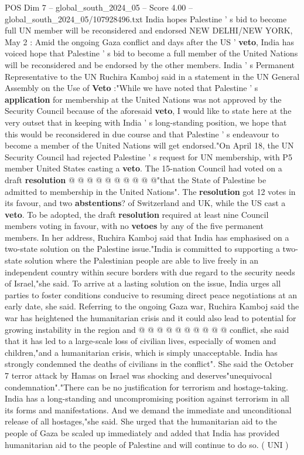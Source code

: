 \begin{textsample}{POS Dim 7 – global\_south\_2024\_05 – Score 4.00 – global\_south\_2024\_05/107928496.txt}  \label{ex:f7_pos_060}
India hopes Palestine ' s bid to become full UN member will be reconsidered and endorsed NEW DELHI/NEW YORK, May 2 : Amid the ongoing Gaza conflict and days after the US ' \textbf{veto}, India has voiced hope that Palestine ' s bid to become a full member of the United Nations will be reconsidered and be endorsed by the other members.
India ' s Permanent Representative to the UN Ruchira Kamboj said in a statement in the UN General Assembly on the Use of \textbf{Veto} :"While we have noted that Palestine ' s \textbf{application} for membership at the United Nations was not approved by the Security Council because of the aforesaid \textbf{veto}, I would like to state here at the very outset that in keeping with India ' s long-standing position, we hope that this would be reconsidered in due course and that Palestine ' s endeavour to become a member of the United Nations will get endorsed."On April 18, the UN Security Council had rejected Palestine ' s request for UN membership, with P5 member United States casting a \textbf{veto}.
The 15-nation Council had voted on a draft \textbf{resolution} @ @ @ @ @ @ @ @ @ @"that the State of Palestine be admitted to membership in the United Nations".
The \textbf{resolution} got 12 votes in its favour, and two \textbf{abstentions}? of Switzerland and UK, while the US cast a \textbf{veto}.
To be adopted, the draft \textbf{resolution} required at least nine Council members voting in favour, with no \textbf{vetoes} by any of the five permanent members.
In her address, Ruchira Kamboj said that India has emphasised on a two-state solution on the Palestine issue."India is committed to supporting a two-state solution where the Palestinian people are able to live freely in an independent country within secure borders with due regard to the security needs of Israel,"she said.
To arrive at a lasting solution on the issue, India urges all parties to foster conditions conducive to resuming direct peace negotiations at an early date, she said.
Referring to the ongoing Gaza war, Ruchira Kamboj said the war has heightened the humanitarian crisis and it could also lead to potential for growing instability in the region and @ @ @ @ @ @ @ @ @ @ conflict, she said that it has led to a large-scale loss of civilian lives, especially of women and children,"and a humanitarian crisis, which is simply unacceptable.
India has strongly condemned the deaths of civilians in the conflict".
She said the October 7 terror attack by Hamas on Israel was shocking and deserves"unequivocal condemnation"."There can be no justification for terrorism and hostage-taking.
India has a long-standing and uncompromising position against terrorism in all its forms and manifestations.
And we demand the immediate and unconditional release of all hostages,"she said.
She urged that the humanitarian aid to the people of Gaza be scaled up immediately and added that India has provided humanitarian aid to the people of Palestine and will continue to do so. ( UNI )

\end{textsample}
